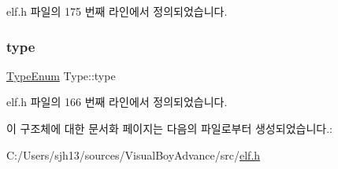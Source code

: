 elf.\+h 파일의 175 번째 라인에서 정의되었습니다.

\mbox{\label{struct_type_a22ff3703af18731e0965866dab0a219f}} 
\subsubsection{\texorpdfstring{type}{type}}
{\footnotesize\ttfamily \mbox{\hyperlink{elf_8h_a600075cb26e64fe549c214f4c5b16b70}{Type\+Enum}} Type\+::type}



elf.\+h 파일의 166 번째 라인에서 정의되었습니다.



이 구조체에 대한 문서화 페이지는 다음의 파일로부터 생성되었습니다.\+:\begin{DoxyCompactItemize}
\item 
C\+:/\+Users/sjh13/sources/\+Visual\+Boy\+Advance/src/\mbox{\hyperlink{elf_8h}{elf.\+h}}\end{DoxyCompactItemize}
